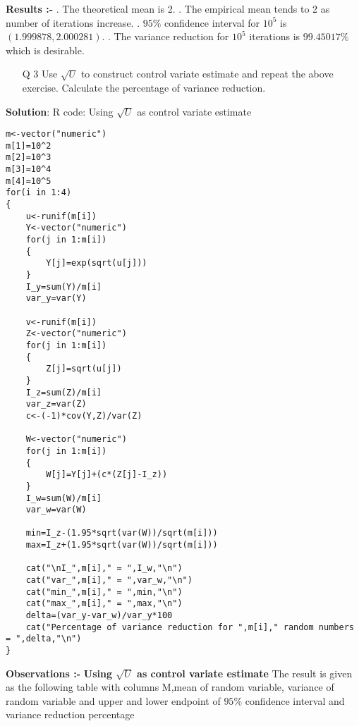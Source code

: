 \documentclass[12pt]{book}
\begin{document}
\textbf{\large Results :-} . The theoretical mean is 2. . The empirical mean tends to 2 as number of iterations increase. . $95\%$ confidence interval for $10^5$ is $( 1.999878,2.000281 )$. . The variance reduction for $10^5$ iterations is $99.45017\%$ which is
desirable.

\newpage

\begin{enumerate}
\item[Q 3] Use $\sqrt{U}$ to construct control variate estimate and repeat the above exercise. Calculate the percentage of variance reduction.
\end{enumerate}

\textbf{Solution}: R code: Using $\sqrt{U}$ as control variate estimate 
\begin{lstlisting}
m<-vector("numeric")
m[1]=10^2
m[2]=10^3
m[3]=10^4
m[4]=10^5
for(i in 1:4)
{
	u<-runif(m[i])
	Y<-vector("numeric")
	for(j in 1:m[i])
	{
		Y[j]=exp(sqrt(u[j]))
	}
	I_y=sum(Y)/m[i]
	var_y=var(Y)

	v<-runif(m[i])
	Z<-vector("numeric")
	for(j in 1:m[i])
	{
		Z[j]=sqrt(u[j])
	}
	I_z=sum(Z)/m[i]
	var_z=var(Z)
	c<-(-1)*cov(Y,Z)/var(Z)

	W<-vector("numeric")
	for(j in 1:m[i])
	{
		W[j]=Y[j]+(c*(Z[j]-I_z))
	}
	I_w=sum(W)/m[i]
	var_w=var(W)

	min=I_z-(1.95*sqrt(var(W))/sqrt(m[i]))
	max=I_z+(1.95*sqrt(var(W))/sqrt(m[i]))

	cat("\nI_",m[i]," = ",I_w,"\n")
	cat("var_",m[i]," = ",var_w,"\n")
	cat("min_",m[i]," = ",min,"\n")
	cat("max_",m[i]," = ",max,"\n")
	delta=(var_y-var_w)/var_y*100
	cat("Percentage of variance reduction for ",m[i]," random numbers = ",delta,"\n")
}
\end{lstlisting}
\textbf{\large Observations :-} \newline
\textbf {Using $\sqrt{U}$ as control variate estimate} \newline
The result is given as the following table with columns M,mean of random variable, variance of random variable and upper and lower endpoint of $95\%$ confidence interval and variance reduction percentage
\end{document}
